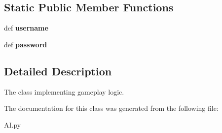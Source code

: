\subsection*{\-Static \-Public \-Member \-Functions}
\begin{DoxyCompactItemize}
\item 
\hypertarget{classAI_1_1AI_a34227a4bfeee49c42e9a550e6ed7f2b0}{def {\bfseries username}}\label{classAI_1_1AI_a34227a4bfeee49c42e9a550e6ed7f2b0}

\item 
\hypertarget{classAI_1_1AI_a6f1c57bdc69e25a367650bc2edd29315}{def {\bfseries password}}\label{classAI_1_1AI_a6f1c57bdc69e25a367650bc2edd29315}

\end{DoxyCompactItemize}


\subsection{\-Detailed \-Description}
\begin{DoxyVerb}The class implementing gameplay logic.\end{DoxyVerb}
 

\-The documentation for this class was generated from the following file\-:\begin{DoxyCompactItemize}
\item 
\-A\-I.\-py\end{DoxyCompactItemize}
